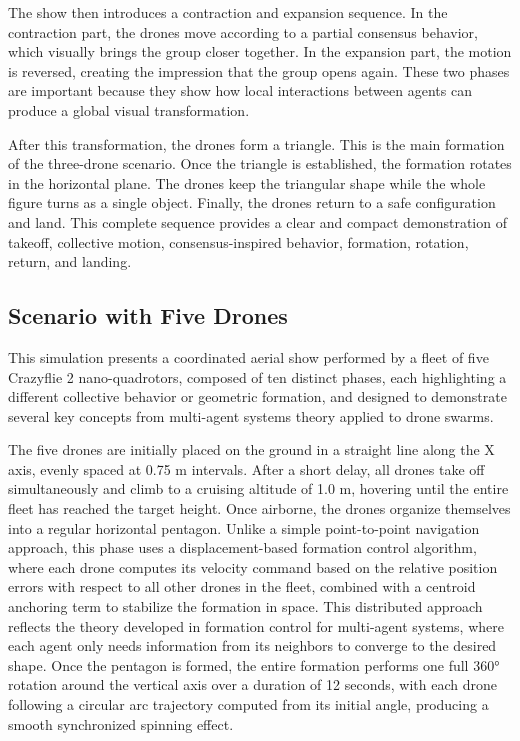 The show then introduces a contraction and expansion sequence. In the contraction part, the drones move according to a partial consensus behavior, which visually brings the group closer together. In the expansion part, the motion is reversed, creating the impression that the group opens again. These two phases are important because they show how local interactions between agents can produce a global visual transformation.

After this transformation, the drones form a triangle. This is the main formation of the three-drone scenario. Once the triangle is established, the formation rotates in the horizontal plane. The drones keep the triangular shape while the whole figure turns as a single object. Finally, the drones return to a safe configuration and land. This complete sequence provides a clear and compact demonstration of takeoff, collective motion, consensus-inspired behavior, formation, rotation, return, and landing.


\subsection{Scenario with Five Drones}

This simulation presents a coordinated aerial show performed by a fleet of five Crazyflie 2 nano-quadrotors, composed of ten distinct phases, each highlighting a different collective behavior or geometric formation, and designed to demonstrate several key concepts from multi-agent systems theory applied to drone swarms.

The five drones are initially placed on the ground in a straight line along the X axis, evenly spaced at 0.75 m intervals. After a short delay, all drones take off simultaneously and climb to a cruising altitude of 1.0 m, hovering until the entire fleet has reached the target height. Once airborne, the drones organize themselves into a regular horizontal pentagon. Unlike a simple point-to-point navigation approach, this phase uses a displacement-based formation control algorithm, where each drone computes its velocity command based on the relative position errors with respect to all other drones in the fleet, combined with a centroid anchoring term to stabilize the formation in space. This distributed approach reflects the theory developed in formation control for multi-agent systems, where each agent only needs information from its neighbors to converge to the desired shape. Once the pentagon is formed, the entire formation performs one full 360° rotation around the vertical axis over a duration of 12 seconds, with each drone following a circular arc trajectory computed from its initial angle, producing a smooth synchronized spinning effect.


